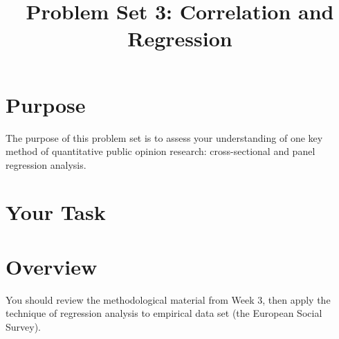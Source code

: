\documentclass[a4paper]{exam}
\title{Problem Set 3: Correlation and Regression}
\date{}
\begin{document}
\vspace{-4em}
\maketitle

\section{Purpose}\label{purpose}

The purpose of this problem set is to assess your understanding of one key method of quantitative public opinion research: cross-sectional and panel regression analysis.

\section{Your Task}\label{your-task}


\section{Overview}\label{overview}

You should review the methodological material from Week 3, then apply the technique of regression analysis to empirical data set (the European Social Survey).
\end{document}
